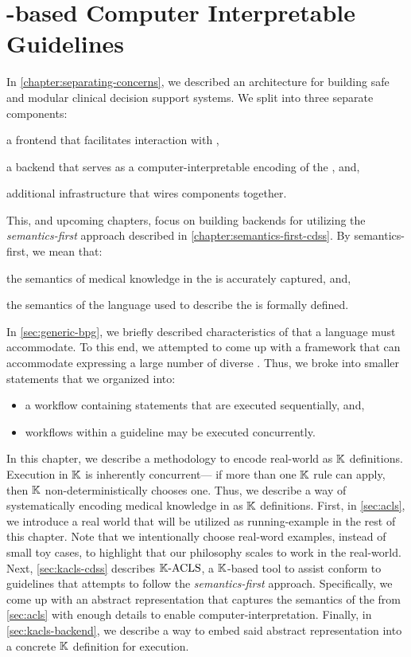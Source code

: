 \chapter{\K{}-based Computer Interpretable Guidelines}

In \autoref{chapter:separating-concerns}, we described an
architecture for building safe and modular clinical decision support systems.
We split \CDSSs{} into three separate components:
\begin{enumerate*}[label=(\alph*)]
  \item a frontend that facilitates interaction with \HCPs{},
  \item a backend that serves as a computer-interpretable encoding of the \BPG{}, and,
  \item additional infrastructure that wires components together.
\end{enumerate*}
This, and upcoming chapters, focus on building backends for \CDSSs{}
utilizing the \emph{semantics-first} approach described in
\autoref{chapter:semantics-first-cdss}. By semantics-first, we
mean that:
\begin{enumerate*}[label=(\alph*)]
 \item the semantics of medical knowledge in the \BPG{} is
 accurately captured, and,
 \item the semantics of the language used to describe the
 \BPG{} is formally defined.
\end{enumerate*}

In \autoref{sec:generic-bpg}, we briefly described characteristics
of \BPGs{} that a \CIG{} language must accommodate.
To this end, we attempted to come up with a framework that
can accommodate expressing a large number of diverse \BPGs{}.
Thus, we broke \BPGs{} into smaller statements that we organized
into:
\begin{itemize}
  \item a workflow containing statements that are executed sequentially, and,
  \item workflows within a guideline may be executed concurrently.
\end{itemize}

In this chapter, we describe a methodology to encode real-world \BPGs{}
as $\mathbb{K}$ definitions. Execution in $\mathbb{K}{}$ is inherently concurrent---
if more than one $\mathbb{K}{}$ rule can apply, then $\mathbb{K}$ non-deterministically
chooses one. Thus, we describe a way of systematically encoding
medical knowledge in \BPGs{} as $\mathbb{K}$ definitions. First, in
\autoref{sec:acls}, we introduce a real world \BPG{} that will be
utilized as running-example in the rest of this chapter. Note that
we intentionally choose real-word examples, instead of small toy cases,
to highlight that our philosophy scales to work in the real-world.
Next, \autoref{sec:kacls-cdss} describes $\mathbb{K}{}\text{-ACLS}{}$, a $\mathbb{K}$-based tool
to assist \HCPs{} conform to \ACLS{} guidelines that attempts to
follow the \emph{semantics-first} approach. Specifically,
we come up with an abstract representation that captures the semantics
of the \BPG{} from \autoref{sec:acls} with enough details to
enable computer-interpretation. Finally, in \autoref{sec:kacls-backend},
we describe a way to embed said abstract representation into a concrete
$\mathbb{K}$ definition for execution.

